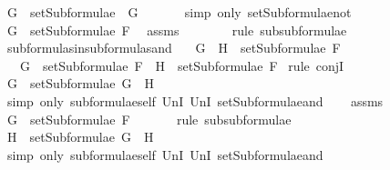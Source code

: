 \begin{isabellebody}
\ {}{\isacharcolon}{\isachardoublequoteopen}G\ {\isasymin}\ setSubformulae\ {\isacharparenleft}\isactrlbold {\isasymnot}\ G{\isacharparenright}{\isachardoublequoteclose}\ \isanewline
\ \ \ \ \isamarkupfalse%
\ {\isacharparenleft}simp\ only{\isacharcolon}\ setSubformulae{\isacharunderscore}not{\isacharparenright}\isanewline
\ \ \isamarkupfalse%
\ {\isachardoublequoteopen}G\ {\isasymin}\ setSubformulae\ F{\isachardoublequoteclose}\ \isamarkupfalse%
\ assms\ {}\ \isanewline
\ \ \ \ \isamarkupfalse%
\ {\isacharparenleft}rule\ subsubformulae{\isacharparenright}\isanewline
{}\isamarkupfalse%
%
\endisatagproof
{\isafoldproof}%
%
\isadelimproof
\isanewline
%
\endisadelimproof
\isanewline
{}\isamarkupfalse%
\ subformulas{\isacharunderscore}in{\isacharunderscore}subformulas{\isacharunderscore}and{\isacharcolon}\isanewline
\ \ \ {\isachardoublequoteopen}G\ \isactrlbold {\isasymand}\ H\ {\isasymin}\ setSubformulae\ F{\isachardoublequoteclose}\ \isanewline
\ \ \ {\isachardoublequoteopen}G\ {\isasymin}\ setSubformulae\ F\ {\isasymand}\ H\ {\isasymin}\ setSubformulae\ F{\isachardoublequoteclose}\isanewline
%
\isadelimproof
%
\endisadelimproof
%
\isatagproof
{}\isamarkupfalse%
\ {\isacharparenleft}rule\ conjI{\isacharparenright}\isanewline
\ \ \isamarkupfalse%
\ {\isachardoublequoteopen}G\ {\isasymin}\ setSubformulae\ {\isacharparenleft}G\ \isactrlbold {\isasymand}\ H{\isacharparenright}{\isachardoublequoteclose}\ \isanewline
\ \ \ \ \isamarkupfalse%
\ {\isacharparenleft}simp\ only{\isacharcolon}\ subformulae{\isacharunderscore}self\ UnI{}\ UnI{}\ setSubformulae{\isacharunderscore}and{\isacharparenright}\isanewline
\ \ \isamarkupfalse%
\ assms\ \isamarkupfalse%
\ {\isachardoublequoteopen}G\ {\isasymin}\ setSubformulae\ F{\isachardoublequoteclose}\ \isanewline
\ \ \ \ \isamarkupfalse%
\ {\isacharparenleft}rule\ subsubformulae{\isacharparenright}\isanewline
{}\isamarkupfalse%
\isanewline
\ \ \isamarkupfalse%
\ {\isachardoublequoteopen}H\ {\isasymin}\ setSubformulae\ {\isacharparenleft}G\ \isactrlbold {\isasymand}\ H{\isacharparenright}{\isachardoublequoteclose}\ \ \isanewline
\ \ \ \ \isamarkupfalse%
\ {\isacharparenleft}simp\ only{\isacharcolon}\ subformulae{\isacharunderscore}self\ UnI{}\ UnI{}\ setSubformulae{\isacharunderscore}and{\isacharparenright}\isanewline

\end{isabellebody}
